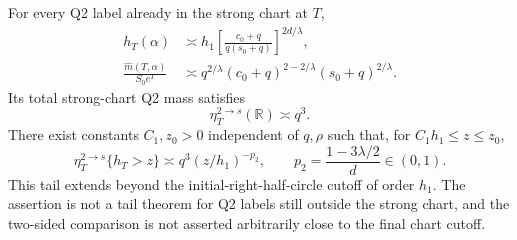 \documentclass[11pt]{article}
\theoremstyle{remark}\newtheorem{remark}[theorem]{Remark}
\begin{document}
\begin{proposition}\label{inc:AN02:q2completion:v1:profile}
For every Q2 label already in the strong chart at $T$,
\begin{align}
 h_T(\alpha)&\asymp h_1
       \left[\frac{c_0+q}{q(s_0+q)}\right]^{2d/\lambda},
       \label{inc:AN02:q2completion:v1:displacement}\\
 \frac{\widehat m(T,\alpha)}{S_0e^T}
 &\asymp q^{2/\lambda}(c_0+q)^{2-2/\lambda}(s_0+q)^{2/\lambda}.
       \label{inc:AN02:q2completion:v1:weight}
\end{align}
Its total strong-chart Q2 mass satisfies
\[
 \eta_T^{2\to s}(\mathbb R)\asymp q^3.
\]
There exist constants $C_1,z_0>0$ independent of $q,\rho$ such that, for
$C_1h_1\le z\le z_0$,
\begin{equation}\label{inc:AN02:q2completion:v1:tail}
 \eta_T^{2\to s}\{h_T>z\}\asymp
 q^3(z/h_1)^{-p_2},\qquad p_2=\frac{1-3\lambda/2}{d}\in(0,1).
\end{equation}
This tail extends beyond the initial-right-half-circle cutoff of order $h_1$. The assertion is not a tail theorem for Q2 labels still outside the strong chart, and the two-sided comparison is not asserted arbitrarily close to the final chart cutoff.
\end{proposition}
\end{document}
